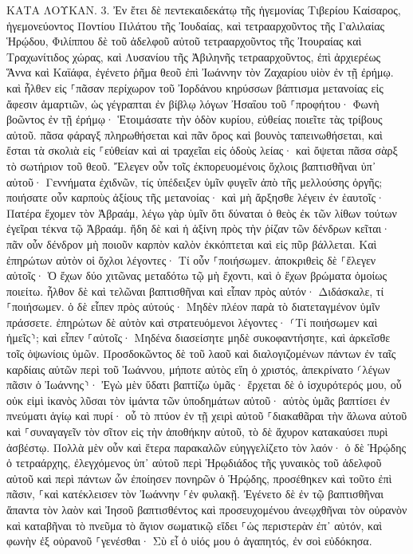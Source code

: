 \documentclass[twoside, 9pt]{extreport}
\begin{document}
ΚΑΤΑ ΛΟΥΚΑΝ.
3.
Ἐν ἔτει δὲ πεντεκαιδεκάτῳ τῆς ἡγεμονίας Τιβερίου Καίσαρος, ἡγεμονεύοντος Ποντίου Πιλάτου τῆς Ἰουδαίας, καὶ τετρααρχοῦντος τῆς Γαλιλαίας Ἡρῴδου, Φιλίππου δὲ τοῦ ἀδελφοῦ αὐτοῦ τετρααρχοῦντος τῆς Ἰτουραίας καὶ Τραχωνίτιδος χώρας, καὶ Λυσανίου τῆς Ἀβιληνῆς τετρααρχοῦντος, 
ἐπὶ ἀρχιερέως Ἅννα καὶ Καϊάφα, ἐγένετο ῥῆμα θεοῦ ἐπὶ Ἰωάννην τὸν Ζαχαρίου υἱὸν ἐν τῇ ἐρήμῳ. 
καὶ ἦλθεν εἰς ⸀πᾶσαν περίχωρον τοῦ Ἰορδάνου κηρύσσων βάπτισμα μετανοίας εἰς ἄφεσιν ἁμαρτιῶν, 
ὡς γέγραπται ἐν βίβλῳ λόγων Ἠσαΐου τοῦ ⸀προφήτου· Φωνὴ βοῶντος ἐν τῇ ἐρήμῳ· Ἑτοιμάσατε τὴν ὁδὸν κυρίου, εὐθείας ποιεῖτε τὰς τρίβους αὐτοῦ. 
πᾶσα φάραγξ πληρωθήσεται καὶ πᾶν ὄρος καὶ βουνὸς ταπεινωθήσεται, καὶ ἔσται τὰ σκολιὰ εἰς ⸀εὐθείαν καὶ αἱ τραχεῖαι εἰς ὁδοὺς λείας· 
καὶ ὄψεται πᾶσα σὰρξ τὸ σωτήριον τοῦ θεοῦ. 
Ἔλεγεν οὖν τοῖς ἐκπορευομένοις ὄχλοις βαπτισθῆναι ὑπ᾽ αὐτοῦ· Γεννήματα ἐχιδνῶν, τίς ὑπέδειξεν ὑμῖν φυγεῖν ἀπὸ τῆς μελλούσης ὀργῆς; 
ποιήσατε οὖν καρποὺς ἀξίους τῆς μετανοίας· καὶ μὴ ἄρξησθε λέγειν ἐν ἑαυτοῖς· Πατέρα ἔχομεν τὸν Ἀβραάμ, λέγω γὰρ ὑμῖν ὅτι δύναται ὁ θεὸς ἐκ τῶν λίθων τούτων ἐγεῖραι τέκνα τῷ Ἀβραάμ. 
ἤδη δὲ καὶ ἡ ἀξίνη πρὸς τὴν ῥίζαν τῶν δένδρων κεῖται· πᾶν οὖν δένδρον μὴ ποιοῦν καρπὸν καλὸν ἐκκόπτεται καὶ εἰς πῦρ βάλλεται. 
Καὶ ἐπηρώτων αὐτὸν οἱ ὄχλοι λέγοντες· Τί οὖν ⸀ποιήσωμεν. 
ἀποκριθεὶς δὲ ⸀ἔλεγεν αὐτοῖς· Ὁ ἔχων δύο χιτῶνας μεταδότω τῷ μὴ ἔχοντι, καὶ ὁ ἔχων βρώματα ὁμοίως ποιείτω. 
ἦλθον δὲ καὶ τελῶναι βαπτισθῆναι καὶ εἶπαν πρὸς αὐτόν· Διδάσκαλε, τί ⸀ποιήσωμεν. 
ὁ δὲ εἶπεν πρὸς αὐτούς· Μηδὲν πλέον παρὰ τὸ διατεταγμένον ὑμῖν πράσσετε. 
ἐπηρώτων δὲ αὐτὸν καὶ στρατευόμενοι λέγοντες· ⸂Τί ποιήσωμεν καὶ ἡμεῖς⸃; καὶ εἶπεν ⸀αὐτοῖς· Μηδένα διασείσητε μηδὲ συκοφαντήσητε, καὶ ἀρκεῖσθε τοῖς ὀψωνίοις ὑμῶν. 
Προσδοκῶντος δὲ τοῦ λαοῦ καὶ διαλογιζομένων πάντων ἐν ταῖς καρδίαις αὐτῶν περὶ τοῦ Ἰωάννου, μήποτε αὐτὸς εἴη ὁ χριστός, 
ἀπεκρίνατο ⸂λέγων πᾶσιν ὁ Ἰωάννης⸃· Ἐγὼ μὲν ὕδατι βαπτίζω ὑμᾶς· ἔρχεται δὲ ὁ ἰσχυρότερός μου, οὗ οὐκ εἰμὶ ἱκανὸς λῦσαι τὸν ἱμάντα τῶν ὑποδημάτων αὐτοῦ· αὐτὸς ὑμᾶς βαπτίσει ἐν πνεύματι ἁγίῳ καὶ πυρί· 
οὗ τὸ πτύον ἐν τῇ χειρὶ αὐτοῦ ⸀διακαθᾶραι τὴν ἅλωνα αὐτοῦ καὶ ⸀συναγαγεῖν τὸν σῖτον εἰς τὴν ἀποθήκην αὐτοῦ, τὸ δὲ ἄχυρον κατακαύσει πυρὶ ἀσβέστῳ. 
Πολλὰ μὲν οὖν καὶ ἕτερα παρακαλῶν εὐηγγελίζετο τὸν λαόν· 
ὁ δὲ Ἡρῴδης ὁ τετραάρχης, ἐλεγχόμενος ὑπ᾽ αὐτοῦ περὶ Ἡρῳδιάδος τῆς γυναικὸς τοῦ ἀδελφοῦ αὐτοῦ καὶ περὶ πάντων ὧν ἐποίησεν πονηρῶν ὁ Ἡρῴδης, 
προσέθηκεν καὶ τοῦτο ἐπὶ πᾶσιν, ⸀καὶ κατέκλεισεν τὸν Ἰωάννην ⸀ἐν φυλακῇ. 
Ἐγένετο δὲ ἐν τῷ βαπτισθῆναι ἅπαντα τὸν λαὸν καὶ Ἰησοῦ βαπτισθέντος καὶ προσευχομένου ἀνεῳχθῆναι τὸν οὐρανὸν 
καὶ καταβῆναι τὸ πνεῦμα τὸ ἅγιον σωματικῷ εἴδει ⸀ὡς περιστερὰν ἐπ᾽ αὐτόν, καὶ φωνὴν ἐξ οὐρανοῦ ⸀γενέσθαι· Σὺ εἶ ὁ υἱός μου ὁ ἀγαπητός, ἐν σοὶ εὐδόκησα. 
\end{document}
